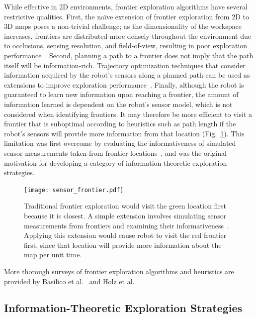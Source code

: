 While effective in 2D environments, frontier exploration algorithms have
several restrictive qualities. First, the na\"{i}ve extension of frontier exploration
from 2D to 3D maps poses a non-trivial challenge; as the
dimensionality of the workspace increases, frontiers are distributed more
densely throughout the environment due to occlusions, sensing resolution, and
field-of-view, resulting in poor exploration performance~\cite{shen20113d}.
Second, planning a path to a frontier does not imply that the path
itself will be information-rich. Trajectory optimization techniques that
consider information acquired by the robot's sensors along a planned path can be used
as extensions to improve exploration performance~\cite{sim2004online,kollar2008trajectory}.
Finally, although the robot is guaranteed to learn new information upon reaching a
frontier, the amount of information learned is dependent on the
robot's sensor model, which is not considered when identifying frontiers.
It may therefore be more efficient to visit a frontier that is
suboptimal according to heuristics such as path length if the robot's sensors
will provide more information from that location
(Fig.~\ref{fig:sensor_frontier}).
This limitation was first overcome by evaluating the informativeness of simulated
sensor measurements taken from frontier locations~\cite{gonzalez2002navigation}, and was the
original motivation for developing a category of information-theoretic exploration strategies.

\begin{figure}
  \centering
  \centering
  \texttt{[image: sensor\_frontier.pdf]}
  \caption{Traditional frontier exploration would visit the green location first
    because it is closest. A simple extension involves simulating sensor
    measurements from frontiers and examining their informativeness~\cite{gonzalez2002navigation}. Applying this
    extension would cause robot to visit the red frontier first, since that
    location will provide more information about the map per unit time.\label{fig:sensor_frontier}}
\end{figure}

More thorough surveys of frontier exploration algorithms and heuristics are provided by
Basilico et al.~\cite{basilico2008evaluating} and Holz et al.~\cite{holz2011comparative}.

\subsection{Information-Theoretic Exploration Strategies}

